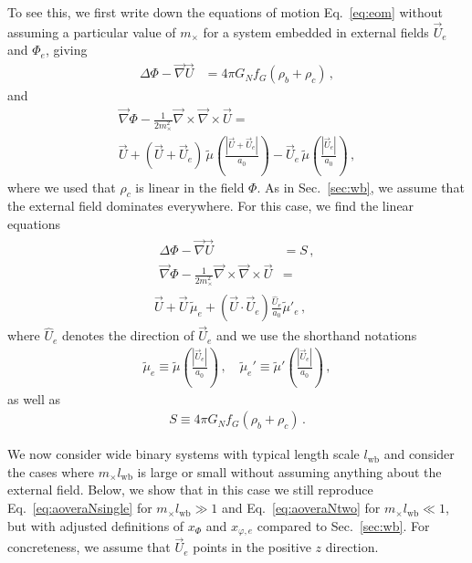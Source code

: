 \documentclass[reprint, amsmath,amssymb, nofootinbib, aps, prd]{revtex4-2}
\begin{document}
To see this, we first write down the equations of motion Eq.~\eqref{eq:eom} without assuming a particular value of $m_\times$ for a system embedded in external fields $\vec{U}_e$ and $\Phi_e$, giving
\begin{align}
 \Delta \Phi - \vec{\nabla} \vec{U} &= 4 \pi G_N f_G (\rho_b + \rho_c) \,,
\end{align}
and
\begin{multline}
\vec{\nabla} \Phi - \frac{1}{2 m_\times^2} \vec{\nabla} \times \vec{\nabla} \times \vec{U} =\\
\vec{U}  + (\vec{U} + \vec{U}_e) \, \tilde{\mu}\left(\frac{|\vec{U} + \vec{U}_e|}{a_0}\right) - \vec{U}_e \, \tilde{\mu} \left(\frac{|\vec{U}_e|}{a_0}\right) \,,
\end{multline}
where we used that $\rho_c$ is linear in the field $\Phi$.
As in Sec.~\ref{sec:wb}, we assume that the external field dominates everywhere.
For this case, we find the linear equations
\begin{multline}
\label{eq:eomefdomgeneral}
\begin{aligned}
 \Delta \Phi - \vec{\nabla} \vec{U} &= S\,, \\
 \vec{\nabla} \Phi - \frac{1}{2 m_\times^2} \vec{\nabla} \times \vec{\nabla} \times \vec{U} &=%
 \end{aligned}%
 \\[-1em]%
  \vec{U}  + \vec{U} \, \tilde{\mu}_e + (\vec{U} \cdot \vec{U}_e) \frac{\hat{U}_e}{a_0} \tilde{\mu}'_e \,,
\end{multline}
where $\hat{U}_e$ denotes the direction of $\vec{U}_e$ and we use the shorthand notations
\begin{align}
 \tilde{\mu}_e \equiv \tilde{\mu}\left(\frac{|\vec{U}_e|}{a_0}\right) \,, \quad
 \tilde{\mu}_e' \equiv \tilde{\mu}'\left(\frac{|\vec{U}_e|}{a_0}\right) \,,
\end{align}
as well as
\begin{align}
 S \equiv 4 \pi G_N f_G (\rho_b + \rho_c) \,.
\end{align}

We now consider wide  binary systems with typical length scale $l_{\mathrm{wb}}$ and consider the cases where $m_\times l_{\mathrm{wb}}$ is large or small without assuming anything about the external field.
Below, we show that in this case we still reproduce Eq.~\eqref{eq:aoveraNsingle} for $m_\times l_{\mathrm{wb}} \gg 1$ and Eq.~\eqref{eq:aoveraNtwo} for $m_\times l_{\mathrm{wb}} \ll 1$, but with adjusted definitions of $x_\Phi$ and $x_{\varphi,e}$ compared to Sec.~\ref{sec:wb}.
For concreteness, we assume that $\vec{U}_e$ points in the positive $z$ direction.
\end{document}
